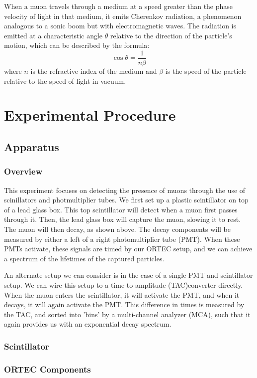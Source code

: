 \documentclass[10pt,letterpaper,onecolumn]{article}
\begin{document}
When a muon travels through a medium at a speed greater than the phase velocity of light in that medium, it emits Cherenkov radiation, a phenomenon analogous to a sonic boom but with electromagnetic waves. The radiation is emitted at a characteristic angle $\theta$ relative to the direction of the particle's motion, which can be described by the formula:
\[
\cos\theta = \frac{1}{n\beta}
\]
where $n$ is the refractive index of the medium and $\beta$ is the speed of the particle relative to the speed of light in vacuum. 
\cite{Jackson1999Electrodynamics}

\section{Experimental Procedure}
\subsection{Apparatus}
\subsubsection{Overview}
This experiment focuses on detecting the presence of muons through the use of scinillators and photmultiplier tubes. We first set up a plastic scintillator on top of a lead glass box. This top scintillator will detect when a muon first passes through it. Then, the lead glass box will capture the muon, slowing it to rest. The muon will then decay, as shown above. The decay components will be measured by either a left of a right photomultiplier tube (PMT). When these PMTs activate, these signals are timed by our ORTEC setup, and we can achieve a spectrum of the lifetimes of the captured particles. 

An alternate setup we can consider is in the case of a single PMT and scintillator setup. We can wire this setup to a time-to-amplitude (TAC)converter directly. When the muon enters the scintillator, it will activate the PMT, and when it decays, it will again activate the PMT. This difference in times is measured by the TAC, and sorted into 'bins' by a multi-channel analyzer (MCA), such that it again provides us with an exponential decay spectrum.
\subsubsection{Scintillator}
\subsubsection{ORTEC Components}
\end{document}
